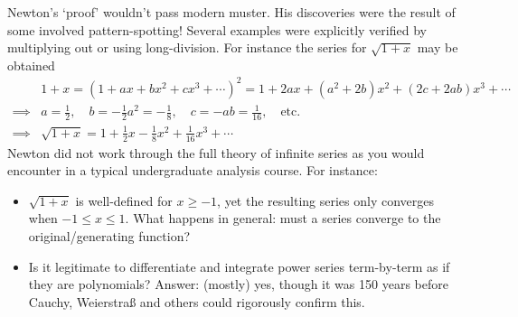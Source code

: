 \goodbreak

Newton's `proof' wouldn't pass modern muster. His discoveries were the result of some involved pattern-spotting! Several examples were explicitly verified by multiplying out or using long-division. For instance the series for $\sqrt{1+x}$ may be obtained
\begin{align*}
	&1+x=(1+ax+bx^2+cx^3+\cdots)^2=1+2ax+(a^2+2b)x^2+(2c+2ab)x^3+\cdots\\
	\implies &a=\frac 12,\quad b=-\frac 12a^2=-\frac 18,\quad c=-ab=\frac 1{16},\quad\text{etc.}\\
	\implies &\sqrt{1+x}=1+\frac 12x-\frac 18x^2+\frac 1{16}x^3+\cdots
\end{align*}
Newton did not work through the full theory of infinite series as you would encounter in a typical undergraduate analysis course. For instance:
\begin{itemize}
  \item $\sqrt{1+x}$ is well-defined for $x\ge -1$, yet the resulting series only converges when $-1\le x\le 1$. What happens in general: must a series converge to the original/generating function?
  \item Is it legitimate to differentiate and integrate power series term-by-term as if they are polynomials? Answer: (mostly) yes, though it was 150 years before Cauchy, Weierstraß and others could rigorously confirm this.
\end{itemize}



\label{pg:newtonpowerlaw}

